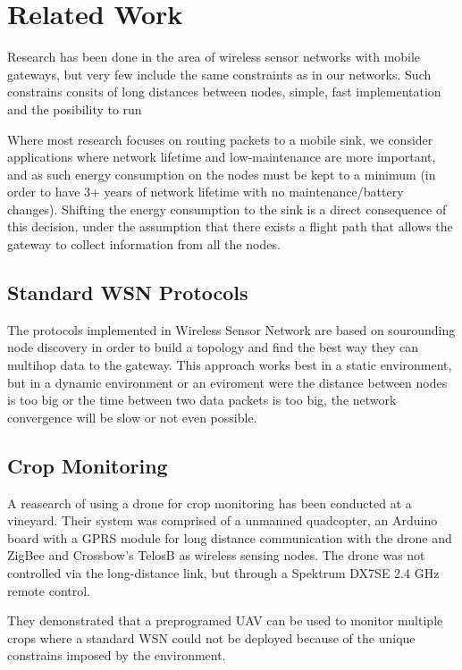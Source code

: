 \normalfont\normalsize
\chapter{Related Work}

Research has been done in the area of wireless sensor networks with mobile gateways, but very few include the same constraints as in our networks. Such constrains consits of long distances between nodes, simple, fast implementation and the posibility to run 

Where most research focuses on routing packets to a mobile sink, we consider applications where network lifetime and low-maintenance are more important, and as such energy consumption on the nodes must be kept to a minimum (in order to have 3+ years of network lifetime
with no maintenance/battery changes). Shifting the energy consumption to the sink is a direct consequence of this decision, under the assumption that there exists a flight path that allows the gateway to collect information from all the nodes.

\section{Standard WSN Protocols}

The protocols implemented in Wireless Sensor Network are based on sourounding node discovery in order to build a topology and find the best way they can multihop data to the gateway. This approach works best in a static environment, but in a dynamic environment or an eviroment were the distance between nodes is too big or the time between two data packets is too big, the network convergence will be slow or not even possible.

\section{Crop Monitoring}

A reasearch of using a drone for crop monitoring has been conducted at a vineyard. Their system was comprised of a unmanned quadcopter, an Arduino board with a GPRS module for long distance communication with  the drone and ZigBee and Crossbow’s TelosB as wireless sensing nodes. The drone was not controlled via the long-distance link, but through a Spektrum DX7SE 2.4 GHz remote control.

They demonstrated that a preprogramed UAV can be used to monitor multiple crops where a standard WSN could not be deployed because of the unique constrains imposed by the environment.

